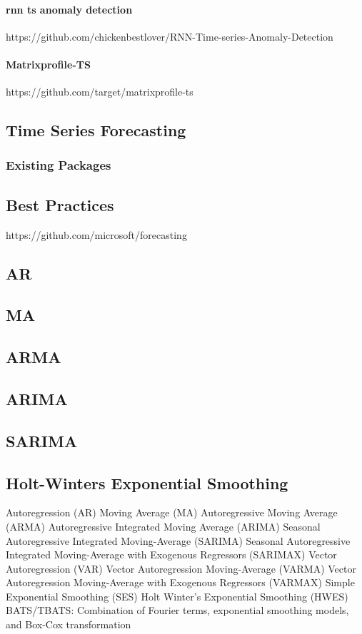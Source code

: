 \paragraph{rnn ts anomaly detection}
https://github.com/chickenbestlover/RNN-Time-series-Anomaly-Detection

\paragraph{Matrixprofile-TS}
https://github.com/target/matrixprofile-ts

\subsection{Time Series Forecasting}
\subsubsection{Existing Packages}
\subsection{Best Practices}
https://github.com/microsoft/forecasting
\subsection{AR}
\subsection{MA}
\subsection{ARMA}
\subsection{ARIMA}
\subsection{SARIMA}
\subsection{Holt-Winters Exponential Smoothing}

Autoregression (AR)
Moving Average (MA)
Autoregressive Moving Average (ARMA)
Autoregressive Integrated Moving Average (ARIMA)
Seasonal Autoregressive Integrated Moving-Average (SARIMA)
Seasonal Autoregressive Integrated Moving-Average with Exogenous Regressors (SARIMAX)
Vector Autoregression (VAR)
Vector Autoregression Moving-Average (VARMA)
Vector Autoregression Moving-Average with Exogenous Regressors (VARMAX)
Simple Exponential Smoothing (SES)
Holt Winter’s Exponential Smoothing (HWES)
BATS/TBATS: Combination of Fourier terms, exponential smoothing models, and Box-Cox transformation 

